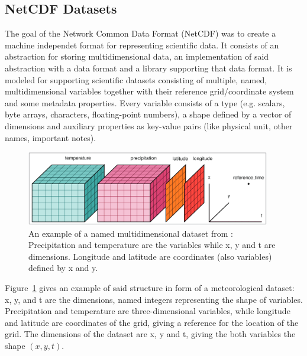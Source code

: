 \subsection{NetCDF Datasets}

The goal of the Network Common Data Format (NetCDF) was to create a machine independet format for representing scientific data. 
It consists of an abstraction for storing multidimensional data, an implementation of said abstraction with a data format and a library supporting that data format. 
It is modeled for supporting scientific datasets consisting of multiple, named, multidimensional variables together with their reference grid/coordinate system and some metadata properties.
Every variable consists of a type (e.g. scalars, byte arrays, characters, floating-point numbers), a shape defined by a vector of dimensions and auxiliary properties as key-value pairs (like physical unit, other names, important notes). \cite{rew_netcdf_1990}

\begin{figure}[htb]
  \begin{center}
    \includegraphics[width=0.95\textwidth]{figures/netcdf_visual_example.png}
  \end{center}
  \caption{An example of a named multidimensional dataset from \cite{hoyer_xarray_2017}: Precipitation and temperature are the variables while x, y and t are dimensions. Longitude and latitude are coordinates (also variables) defined by x and y.}
  \label{fig:example_dataset_structure}
\end{figure}

Figure~\ref{fig:example_dataset_structure} gives an example of said structure in form of a meteorological dataset: x, y, and t are the dimensions, named integers representing the shape of variables. 
Precipitation and temperature are three-dimensional variables, while longitude and latitude are coordinates of the grid, giving a reference for the location of the grid. The dimensions of the dataset are x, y and t, giving the both variables the shape $(x, y, t)$. \cite{hoyer_xarray_2017}



